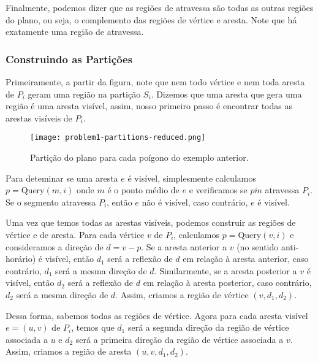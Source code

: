 \documentclass{article}
\begin{document}
Finalmente, podemos dizer que as regiões de atravessa são todas as outras regiões do plano, ou seja, o complemento das regiões de vértice e aresta. Note que há exatamente uma região de atravessa.

\subsubsection{Construindo as Partições}

Primeiramente, a partir da figura, note que nem todo vértice e nem toda aresta de \(P_i\) geram uma região na partição \(S_i\). Dizemos que uma aresta que gera uma região é uma aresta visível, assim, nosso primeiro passo é encontrar todas as arestas visíveis de \(P_i\). 

\begin{wrapfigure}{l}{0.60\textwidth}

\vspace{-5pt}
\centering
\texttt{[image: problem1-partitions-reduced.png]}
\caption{Partição do plano para cada poígono do exemplo anterior.}

\end{wrapfigure}

Para deteminar se uma aresta \(e\) é visível, simplesmente calculamos \(p = \text{Query}(m, i)\) onde \(m\) é o ponto médio de \(e\) e verificamos se \(\overline{pm}\) atravessa \(P_i\). Se o segmento atravessa \(P_i\), então \(e\) não é visível, caso contrário, \(e\) é visível.

Uma vez que temos todas as arestas visíveis, podemos construir as regiões de vértice e de aresta. Para cada vértice \(v\) de \(P_i\), calculamos \(p = \text{Query}(v, i)\) e consideramos a direção de \(d = v - p\).
Se a aresta anterior a \(v\) (no sentido anti-horário) é visível, então \(d_1\) será a reflexão de \(d\) em relação à aresta anterior, caso contrário, \(d_1\) será a mesma direção de \(d\). Similarmente, se a aresta posterior a \(v\) é visível, então \(d_2\) será a reflexão de \(d\) em relação à aresta posterior, caso contrário, \(d_2\) será a mesma direção de \(d\). Assim, criamos a região de vértice \((v, d_1, d_2)\).

Dessa forma, sabemos todas as regiões de vértice. Agora para cada aresta visível \(e = (u, v)\) de \(P_i\), temos que \(d_1\) será a segunda direção da região de vértice associada a \(u\) e \(d_2\) será a primeira direção da região de vértice associada a \(v\). Assim, criamos a região de aresta \((u, v, d_1, d_2)\).
\end{document}

